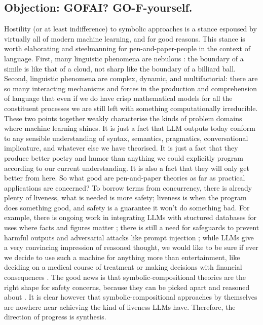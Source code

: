 \subsection{\textbf{Objection:} GOFAI? GO-F-yourself.}
 
Hostility (or at least indifference) to symbolic approaches is a stance espoused by virtually all of modern machine learning, and for good reasons. This stance is worth elaborating and steelmanning for pen-and-paper-people in the context of language. First, many linguistic phenomena are nebulous \citep{}: the boundary of a simile is like that of a cloud, not sharp like the boundary of a billiard ball. Second, linguistic phenomena are complex, dynamic, and multifactorial: there are so many interacting mechanisms and forces in the production and comprehension of language that even if we do have crisp mathematical models for all the constituent processes we are still left with something computationally irreducible.  These two points together weakly characterise the kinds of problem domains where machine learning shines. It is just a fact that LLM outputs today conform to any sensible understanding of syntax, semantics, pragmatics, conversational implicature, and whatever else we have theorised. It is just a fact that they produce better poetry and humor than anything we could explicitly program according to our current understanding. It is also a fact that they will only get better from here. So what good are pen-and-paper theories as far as practical applications are concerned? To borrow terms from concurrency, there is already plenty of liveness, what is needed is more safety; liveness is when the program does something good, and safety is a guarantee it won't do something bad. For example, there is ongoing work in integrating LLMs with stuctured databases for uses where facts and figures matter \citep{}; there is still a need for safeguards to prevent harmful outputs \citep{} and adversarial attacks like prompt injection \citep{}; while LLMs give a very convincing impression of reasoned thought, we would like to be sure if ever we decide to use such a machine for anything more than entertainment, like deciding on a medical course of treatment \citep{} or making decisions with financial consequences \citep{}. The good news is that symbolic-compositional theories are the right shape for safety concerns, because they can be picked apart and reasoned about \citep{}. It is clear however that symbolic-compositional approaches by themselves are nowhere near achieving the kind of liveness LLMs have. Therefore, the direction of progress is synthesis.\\

